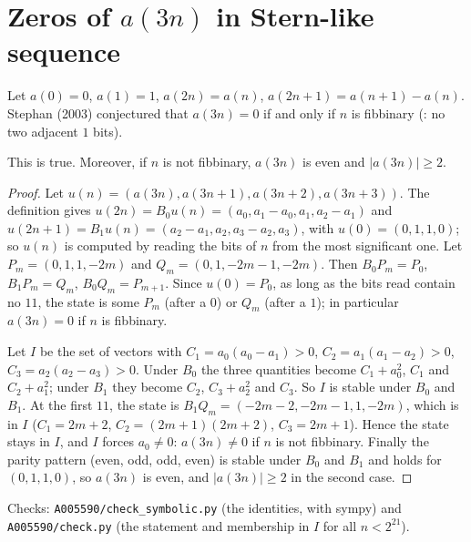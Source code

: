 \section{Zeros of \texorpdfstring{$a(3n)$}{a(3n)} in Stern-like sequence }\label{s:A005590}
Let $a(0)=0$, $a(1)=1$, $a(2n)=a(n)$, $a(2n+1)=a(n+1)-a(n)$. Stephan (2003) conjectured that $a(3n)=0$ if and
only if $n$ is fibbinary (: no two adjacent $1$ bits).
\begin{theorem}\label{t:A005590} This is true. Moreover, if $n$ is not fibbinary, $a(3n)$ is even and
$|a(3n)|\ge2$.\end{theorem}
\begin{proof} Let $u(n)=(a(3n),a(3n+1),a(3n+2),a(3n+3))$. The definition gives
$u(2n)=B_0u(n)=(a_0,a_1-a_0,a_1,a_2-a_1)$ and $u(2n+1)=B_1u(n)=(a_2-a_1,a_2,a_3-a_2,a_3)$, with $u(0)=(0,1,1,0)$;
so $u(n)$ is computed by reading the bits of $n$ from the most significant one. Let $P_m=(0,1,1,-2m)$ and
$Q_m=(0,1,-2m-1,-2m)$. Then $B_0P_m=P_0$, $B_1P_m=Q_m$, $B_0Q_m=P_{m+1}$. Since $u(0)=P_0$, as long as the bits read
contain no $11$, the state is some $P_m$ (after a $0$) or $Q_m$ (after a $1$); in particular $a(3n)=0$ if $n$ is
fibbinary.

Let $I$ be the set of vectors with $C_1=a_0(a_0-a_1)>0$, $C_2=a_1(a_1-a_2)>0$, $C_3=a_2(a_2-a_3)>0$. Under $B_0$
the three quantities become $C_1+a_0^2$, $C_1$ and $C_2+a_1^2$; under $B_1$ they become $C_2$, $C_3+a_2^2$ and
$C_3$. So $I$ is stable under $B_0$ and $B_1$. At the first $11$, the state is $B_1Q_m=(-2m-2,-2m-1,1,-2m)$,
which is in $I$ ($C_1=2m+2$, $C_2=(2m+1)(2m+2)$, $C_3=2m+1$). Hence the state stays in $I$, and $I$ forces
$a_0\ne0$: $a(3n)\ne0$ if $n$ is not fibbinary. Finally the parity pattern (even, odd, odd, even) is stable
under $B_0$ and $B_1$ and holds for $(0,1,1,0)$, so $a(3n)$ is even, and $|a(3n)|\ge2$ in the second case.
\end{proof}
Checks: \texttt{A005590/check\_symbolic.py} (the identities, with sympy) and \texttt{A005590/check.py}
(the statement and membership in $I$ for all $n<2^{21}$).

